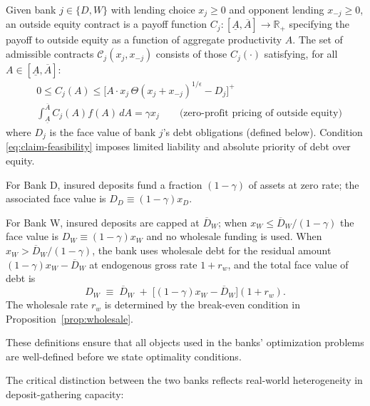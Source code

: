 \documentclass[12pt]{article}
\begin{document}
\begin{definition}\label{def:outside-equity}
Given bank $j\in\{D,W\}$ with lending choice $x_j\ge 0$ and opponent lending $x_{-j}\ge 0$, an outside equity contract is a payoff function $C_j:[\underline A,\overline A]\to \mathbb{R}_+$ specifying the payoff to outside equity as a function of aggregate productivity $A$. The set of admissible contracts $\mathcal{C}_j(x_j,x_{-j})$ consists of those $C_j(\cdot)$ satisfying, for all $A\in[\underline A,\overline A]$:
\begin{align}
    &0 \le C_j(A) \le \big[A\cdot x_j\,\Theta(x_j+x_{-j})^{1/\epsilon} - D_j\big]^+  \label{eq:claim-feasibility}\\
    &\int_{\underline A}^{\overline A} C_j(A)f(A)\,dA = \gamma x_j \qquad \text{(zero-profit pricing of outside equity)} \label{eq:outside-equity-pricing}
\end{align}
where $D_j$ is the face value of bank $j$'s debt obligations (defined below). Condition \eqref{eq:claim-feasibility} imposes limited liability and absolute priority of debt over equity.
\end{definition}

\begin{definition}
For Bank D, insured deposits fund a fraction $(1-\gamma)$ of assets at zero rate; the associated face value is $D_D\equiv (1-\gamma)x_D$.

For Bank W, insured deposits are capped at $\overline D_W$; when $x_W\le \overline D_W/(1-\gamma)$ the face value is $D_W\equiv (1-\gamma)x_W$ and no wholesale funding is used. When $x_W>\overline D_W/(1-\gamma)$, the bank uses wholesale debt for the residual amount $(1-\gamma)x_W-\overline D_W$ at endogenous gross rate $1+r_w$, and the total face value of debt is
\[
    D_W\;\equiv\; \overline D_W \; +\; \big[(1-\gamma)x_W-\overline D_W\big](1+r_w).
\]
The wholesale rate $r_w$ is determined by the break-even condition in Proposition~\ref{prop:wholesale}.
\end{definition}

These definitions ensure that all objects used in the banks' optimization problems are well-defined before we state optimality conditions.

The critical distinction between the two banks reflects real-world heterogeneity in deposit-gathering capacity:
\end{document}
